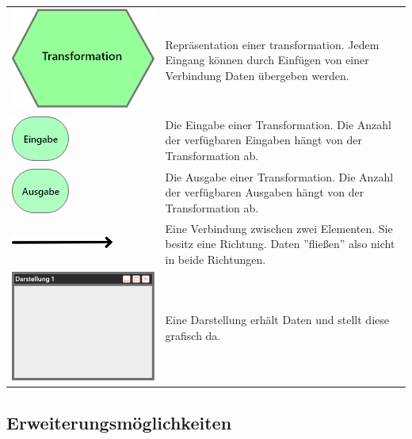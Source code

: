 \documentclass[parskip=full]{scrartcl}
\begin{document}
\begin{tabular}[t]{p{1cm} p{10cm}}
	\vspace{0cm}\includegraphics[width = 1 cm]{Grafik/Verbindungselement.png} & Repräsentation einer \gls{transformation}. Jedem Eingang können durch Einfügen von einer Verbindung Daten übergeben werden.\newline\\
	\vspace{0cm}\includegraphics[width = 1 cm]{Grafik/Eingabe-Verbindung.png} & Die Eingabe einer Transformation. Die Anzahl der verfügbaren Eingaben hängt von der Transformation ab.\newline\\
	\vspace{0cm}\includegraphics[width = 1 cm]{Grafik/Ausgabe-Transformation.png} & Die Ausgabe einer Transformation. Die Anzahl der verfügbaren Ausgaben hängt von der Transformation ab.\newline\\\cline{1-2}
	\vspace{0cm}\includegraphics[width = 1 cm]{Grafik/Verbindungspfeil.png} & Eine Verbindung zwischen zwei Elementen. Sie besitz eine Richtung. Daten ''fließen'' also nicht in beide Richtungen.\newline\\\cline{1-2}
	\vspace{0cm}\includegraphics[width = 1 cm]{Grafik/Darstellungsfenster.png} & Eine Darstellung erhält Daten und stellt diese grafisch da.\newline\\
\end{tabular}

\clearpage

\subsection{Erweiterungsmöglichkeiten}
\end{document}
